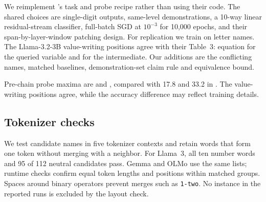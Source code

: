 We reimplement \citet{kudo2026faithful}'s task and probe recipe rather than using their code.
The shared choices are single-digit outputs, same-level demonstrations, a 10-way linear
residual-stream classifier, full-batch SGD at $10^{-3}$ for 10,000 epochs, and their
span-by-layer-window patching design. For replication we train on letter names.
The Llama-3.2-3B value-writing positions agree with their Table~3: equation
 for the queried variable and  for the intermediate.
Our additions are the conflicting names, matched baselines, demonstration-set claim rule and
equivalence bound.

Pre-chain probe maxima are  and ,
compared with 17.8 and 33.2 in \citet{kudo2026faithful}. The value-writing positions
agree, while the accuracy difference may reflect training details.



\subsection{Tokenizer checks}

\label{app:tok}
We test candidate names in five tokenizer contexts and retain words that form one token
without merging with a neighbor. For Llama~3, all ten number words and 95 of 112 neutral
candidates pass. Gemma and OLMo use the same lists; runtime checks confirm equal token lengths
and positions within matched groups. Spaces around binary operators prevent merges such as
\texttt{1-two}. No instance in the reported runs is excluded by the layout check.

